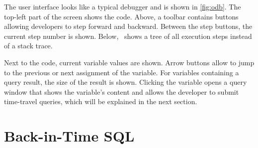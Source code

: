 The user interface looks like a typical debugger and is shown in \cref{fig:odb}.
The top-left part of the screen shows the code.
Above, a toolbar contains buttons allowing developers to step forward and backward.
Between the step buttons, the current step number is shown.
Below, \tool\ shows a tree of all execution steps instead of a stack trace.

Next to the code, current variable values are shown.
Arrow buttons allow to jump to the previous or next assignment of the variable.
For variables containing a query result, the size of the result is shown.
Clicking the variable opens a query window that shows the variable's content and allows the developer to submit time-travel queries, which will be explained in the next section.

\section{Back-in-Time SQL}



